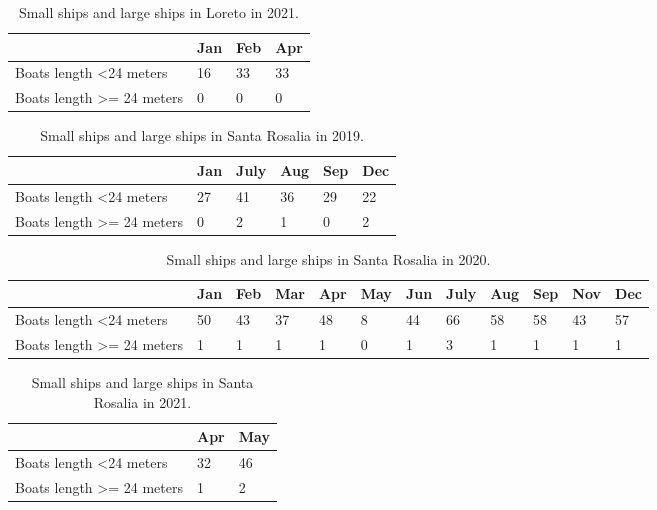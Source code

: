 \begin{table}[h!]
\begin{tabular}{|l|l|l|l|}
\hline
                                       & Jan & Feb & Apr \\ \hline
Boats length \textless 24 meters       & 16  & 33  & 33  \\ \hline
Boats length \textgreater{}= 24 meters & 0   & 0   & 0   \\ \hline
\end{tabular}
\caption{Small ships and large ships in Loreto in 2021.}
\end{table}


\begin{table}[h!]
\begin{tabular}{|l|l|l|l|l|l|}
\hline
                                       & Jan & July & Aug & Sep & Dec \\ \hline
Boats length \textless 24 meters       & 27  & 41   & 36  & 29  & 22  \\ \hline
Boats length \textgreater{}= 24 meters & 0   & 2    & 1   & 0   & 2   \\ \hline
\end{tabular}
\caption{Small ships and large ships in Santa Rosalia in 2019.}
\end{table}


\begin{table}[h!]
\begin{tabular}{|l|l|l|l|l|l|l|l|l|l|l|l|}
\hline
                                       & Jan & Feb & Mar & Apr & May & Jun & July & Aug & Sep & Nov & Dec \\ \hline
Boats length \textless 24 meters       & 50  & 43  & 37  & 48  & 8   & 44  & 66   & 58  & 58  & 43  & 57  \\ \hline
Boats length \textgreater{}= 24 meters & 1   & 1   & 1   & 1   & 0   & 1   & 3    & 1   & 1   & 1   & 1   \\ \hline
\end{tabular}
\caption{Small ships and large ships in Santa Rosalia in 2020.}
\end{table}


\begin{table}[h!]
\begin{tabular}{|l|l|l|}
\hline
                                       & Apr & May \\ \hline
Boats length \textless 24 meters       & 32  & 46  \\ \hline
Boats length \textgreater{}= 24 meters & 1   & 2   \\ \hline
\end{tabular}
\caption{Small ships and large ships in Santa Rosalia in 2021.}
\end{table}




